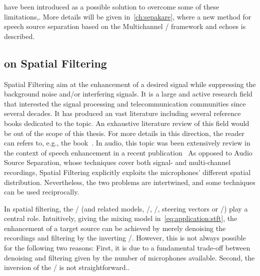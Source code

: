  have been introduced as a possible solution to overcome some of these limitations,.
More details will be given in~\cref{ch:sepakare}, where a new method for speech source separation based on the Multichannel \NMF/ framework and echoes is described.

\subsection{on Spatial Filtering}\label{subsec:application:filtering}
Spatial Filtering aim at the enhancement of a desired signal while suppressing the background noise and/or interfering signals.
It is a large and active research field that interested the signal processing and telecommunication communities since several decades.
It has produced an vast literature including several reference books dedicated to the topic.
An exhaustive literature review of this field would be out of the scope of this thesis.
For more details in this direction, the reader can refers to, e.g., the book~.
In audio, this topic was been extensively review in the context of speech enhancement in a recent publication~
As opposed to Audio Source Separation, whose techniques cover both signal- and multi-channel recordings, Spatial Filtering explicitly exploits the microphones' different spatial distribution.
Nevertheless, the two problems are intertwined, and some techniques can be used reciprocally.

\mynewline
In spatial filtering, the \RIRs/ (and related models, \eg/, \RTFs/, steering vectors or \ReTFs/) play a central role.
Intuitively, giving the mixing model in~\cref{eq:application:stft}, the enhancement of a target source can be achieved by merely denoising the recordings and filtering by the inverting \RIRs/.
However, this is not always possible for the following two reasons:
First, it is due to a fundamental trade-off between denoising and filtering given by the number of microphones available.
Second, the inversion of the \RIRs/ is not straightforward..

